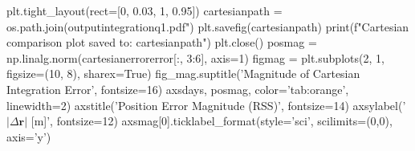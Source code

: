 {}
\markdownRendererSectionEnd \markdownRendererSectionBegin
{}\markdownRendererInterblockSeparator
{}plt.tight_layout(rect=[0, 0.03, 1, 0.95])\markdownRendererInterblockSeparator
{}
\markdownRendererSectionEnd \markdownRendererSectionBegin
{}\markdownRendererInterblockSeparator
{}cartesianpath = os.path.join(outputintegrationq1.pdf") plt.savefig(cartesianpath) print(f"Cartesian comparison plot saved to: {cartesianpath}") plt.close()\markdownRendererInterblockSeparator
{}
\markdownRendererSectionEnd \markdownRendererSectionBegin
{}\markdownRendererInterblockSeparator
{}
\markdownRendererSectionEnd \markdownRendererSectionBegin
{}\markdownRendererInterblockSeparator
{}
\markdownRendererSectionEnd \markdownRendererSectionBegin
{}\markdownRendererInterblockSeparator
{}posmag = np.linalg.norm(cartesianerrorerror[:, 3:6], axis=1)\markdownRendererInterblockSeparator
{}
\markdownRendererSectionEnd \markdownRendererSectionBegin
{}\markdownRendererInterblockSeparator
{}figmag = plt.subplots(2, 1, figsize=(10, 8), sharex=True) fig_mag.suptitle('Magnitude of Cartesian Integration Error', fontsize=16)\markdownRendererInterblockSeparator
{}
\markdownRendererSectionEnd \markdownRendererSectionBegin
{}\markdownRendererInterblockSeparator
{}axsdays, posmag, color='tab:orange', linewidth=2) axstitle('Position Error Magnitude (RSS)', fontsize=14) axsylabel('$|\Delta \mathbf{r}|$ [m]', fontsize=12) axsmag[0].ticklabel_format(style='sci', scilimits=(0,0), axis='y')\markdownRendererInterblockSeparator
{}
\markdownRendererSectionEnd \markdownRendererSectionBegin
{}\markdownRendererInterblockSeparator
